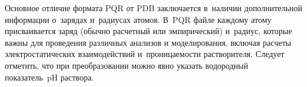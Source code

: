Основное отличие формата PQR от PDB заключается в~наличии дополнительной информации о~зарядах и~радиусах атомов. В~PQR файле каждому атому присваивается заряд (обычно расчетный или эмпирический) и~радиус, которые важны для проведения различных анализов и моделирования, включая расчеты электростатических взаимодействий и~проницаемости растворителя. Следует отметить, что при преобразовании можно явно указать водородный показатель~pH раствора.






